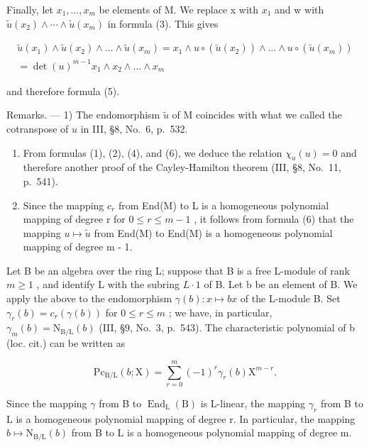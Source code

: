 Finally, let \(x_{1},\ldots,x_{m}\) be elements of M. We replace x with \(x_{1}\) and w with \(\widetilde{u}(x_{2})\wedge\cdots\wedge\widetilde{u}(x_{m})\) in formula (3). This gives

\[
\begin{array}{c} \widetilde {u} (x _ {1}) \wedge \widetilde {u} (x _ {2}) \wedge \dots \wedge \widetilde {u} (x _ {m}) = x _ {1} \wedge u \circ (\widetilde {u} (x _ {2})) \wedge \dots \wedge u \circ (\widetilde {u} (x _ {m})) \\ = \det (u) ^ {m - 1} x _ {1} \wedge x _ {2} \wedge \dots \wedge x _ {m} \end{array}
\]

and therefore formula (5).

Remarks. --- 1) The endomorphism \(\widetilde{u}\) of M coincides with what we called the cotranspose of \(u\) in III, §8, No.~6, p.~532.

\begin{enumerate}
\def\labelenumi{\arabic{enumi})}
\setcounter{enumi}{1}
\item
  From formulas (1), (2), (4), and (6), we deduce the relation \(\chi_u(u) = 0\) and therefore another proof of the Cayley-Hamilton theorem (III, §8, No.~11, p.~541).
\item
  Since the mapping \(c_{r}\) from End(M) to L is a homogeneous polynomial mapping of degree r for \(0 \leqslant r \leqslant m - 1\) , it follows from formula (6) that the mapping \(u \mapsto \widetilde{u}\) from End(M) to End(M) is a homogeneous polynomial mapping of degree m - 1.
\end{enumerate}

Let B be an algebra over the ring L; suppose that B is a free L-module of rank \(m \geqslant 1\) , and identify L with the subring \(L \cdot 1\) of B. Let b be an element of B. We apply the above to the endomorphism \(\gamma(b) : x \mapsto bx\) of the L-module B. Set \(\gamma_{r}(b) = c_{r}(\gamma(b))\) for \(0 \leqslant r \leqslant m\) ; we have, in particular, \(\gamma_{m}(b) = \mathrm{N}_{\mathrm{B/L}}(b)\) (III, §9, No.~3, p.~543). The characteristic polynomial of b (loc. cit.) can be written as

\[
\mathrm{Pc} _ {\mathrm{B/L}} (b; \mathrm{X}) = \sum_ {r = 0} ^ {m} (- 1) ^ {r} \gamma_ {r} (b) \mathrm{X} ^ {m - r}.\tag{16}
\]

Since the mapping \(\gamma\) from B to \(\operatorname{End}_{\mathrm{L}}(\mathrm{B})\) is L-linear, the mapping \(\gamma_{r}\) from B to L is a homogeneous polynomial mapping of degree r. In particular, the mapping \(b \mapsto \mathrm{N}_{\mathrm{B}/\mathrm{L}}(b)\) from B to L is a homogeneous polynomial mapping of degree m.

